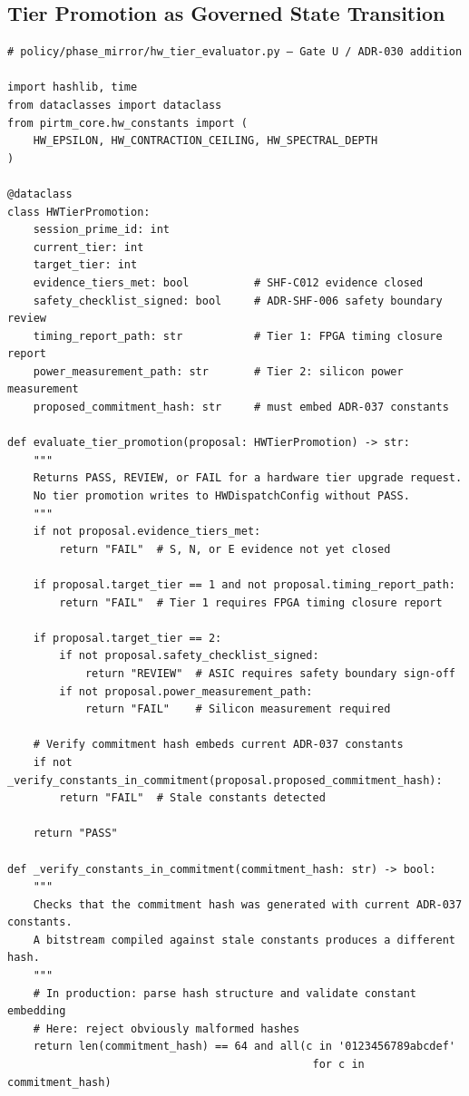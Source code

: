 \documentclass[12pt,letterpaper]{article}
\theoremstyle{plain}
\theoremstyle{definition}
\theoremstyle{remark}
\begin{document}
\subsection{Tier Promotion as Governed State Transition}

\begin{lstlisting}[style=pythonstyle, caption={Phase Mirror tier promotion evaluator (ADR-030/ADR-032)}, label=lst:governance]
# policy/phase_mirror/hw_tier_evaluator.py — Gate U / ADR-030 addition

import hashlib, time
from dataclasses import dataclass
from pirtm_core.hw_constants import (
    HW_EPSILON, HW_CONTRACTION_CEILING, HW_SPECTRAL_DEPTH
)

@dataclass
class HWTierPromotion:
    session_prime_id: int
    current_tier: int
    target_tier: int
    evidence_tiers_met: bool          # SHF-C012 evidence closed
    safety_checklist_signed: bool     # ADR-SHF-006 safety boundary review
    timing_report_path: str           # Tier 1: FPGA timing closure report
    power_measurement_path: str       # Tier 2: silicon power measurement
    proposed_commitment_hash: str     # must embed ADR-037 constants

def evaluate_tier_promotion(proposal: HWTierPromotion) -> str:
    """
    Returns PASS, REVIEW, or FAIL for a hardware tier upgrade request.
    No tier promotion writes to HWDispatchConfig without PASS.
    """
    if not proposal.evidence_tiers_met:
        return "FAIL"  # S, N, or E evidence not yet closed

    if proposal.target_tier == 1 and not proposal.timing_report_path:
        return "FAIL"  # Tier 1 requires FPGA timing closure report

    if proposal.target_tier == 2:
        if not proposal.safety_checklist_signed:
            return "REVIEW"  # ASIC requires safety boundary sign-off
        if not proposal.power_measurement_path:
            return "FAIL"    # Silicon measurement required

    # Verify commitment hash embeds current ADR-037 constants
    if not _verify_constants_in_commitment(proposal.proposed_commitment_hash):
        return "FAIL"  # Stale constants detected

    return "PASS"

def _verify_constants_in_commitment(commitment_hash: str) -> bool:
    """
    Checks that the commitment hash was generated with current ADR-037 constants.
    A bitstream compiled against stale constants produces a different hash.
    """
    # In production: parse hash structure and validate constant embedding
    # Here: reject obviously malformed hashes
    return len(commitment_hash) == 64 and all(c in '0123456789abcdef'
                                               for c in commitment_hash)
\end{lstlisting}
\end{document}
